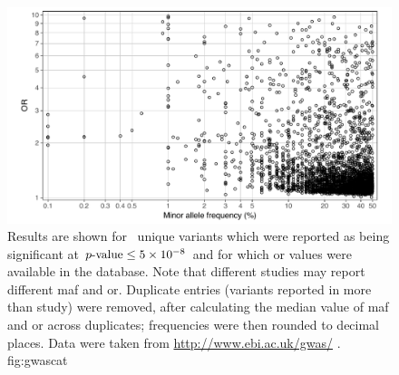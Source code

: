 

\begin{figure}[!htb]
\includegraphics[width=\textwidth]{./img/ch1/gwascat}
{Results are shown for ~unique variants which were reported as being significant at ${\mbox{$p$-value}\leq\num{5e-8}}$ and for which \gls{or} values were available in the database.
Note that different studies may report different \gls{maf} and \gls{or}.
Duplicate entries (variants reported in more than  study) were removed, after calculating the median value of \gls{maf} and \gls{or} across duplicates; frequencies were then rounded to  decimal places.
Data were taken from \url{http://www.ebi.ac.uk/gwas/} .}
{fig:gwascat}
\end{figure}
